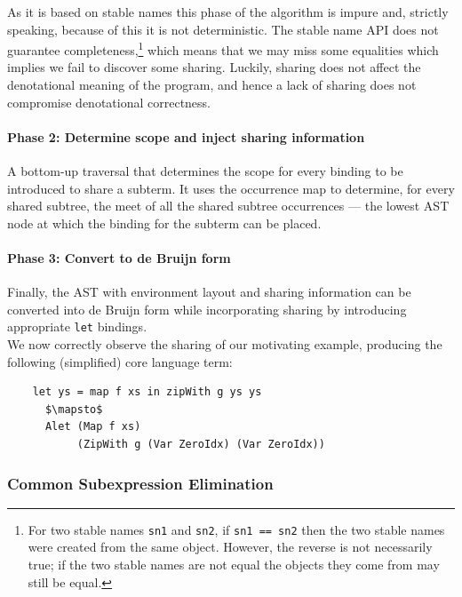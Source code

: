 As it is based on stable names this phase of the algorithm is impure and,
strictly speaking, because of this it is not deterministic. The stable name API
does not guarantee completeness,\footnote{For two stable names \lstinline{sn1}
and \lstinline{sn2}, if \lstinline{sn1 == sn2} then the two stable names were
created from the same object. However, the reverse is not necessarily true; if
the two stable names are not equal the objects they come from may still be
equal.} which means that we may miss some equalities which implies we fail to
discover some sharing. Luckily, sharing does not affect the denotational meaning
of the program, and hence a lack of sharing does not compromise denotational
correctness.


\paragraph{Phase 2: Determine scope and inject sharing information}

A bottom-up traversal that determines the scope for every binding to be
introduced to share a subterm. It uses the occurrence map to determine, for
every shared subtree, the meet of all the shared subtree occurrences --- the
lowest AST node at which the binding for the subterm can be placed.

\paragraph{Phase 3: Convert to de Bruijn form}

Finally, the AST with environment layout and sharing information can be
converted into de Bruijn form while incorporating sharing by introducing
appropriate \texttt{let} bindings.\\

\noindent
We now correctly observe the sharing of our motivating example, producing the
following (simplified) core language term:
%
\begin{lstlisting}[style=Haskell,numbers=none,mathescape]
%\bf$\langle$ sharing observation $\rangle$%
    let ys = map f xs in zipWith g ys ys
      $\mapsto$
      Alet (Map f xs)
           (ZipWith g (Var ZeroIdx) (Var ZeroIdx))
\end{lstlisting}


\subsubsection{Common Subexpression Elimination}
\label{sec:cse}

